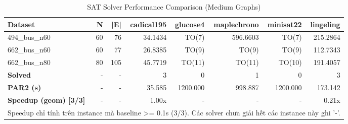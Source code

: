 \begin{table}[htbp]
\centering
\caption{SAT Solver Performance Comparison (Medium Graphs)}
\label{tab:table_solvers_medium}
\begin{tabular}{lrrrrrrr}
\toprule
Dataset & N & |E| & cadical195 & glucose4 & maplechrono & minisat22 & lingeling \\
\midrule
494\_bus\_n60 & 60 & 76 & 34.1434 & TO(7) & 596.6603 & TO(7) & 215.2864 \\
662\_bus\_n60 & 60 & 77 & 26.8385 & TO(9) & TO(9) & TO(9) & 112.7343 \\
662\_bus\_n80 & 80 & 105 & 45.7719 & TO(11) & TO(11) & TO(10) & 191.4057 \\
\midrule
\textbf{Solved} & - & - & 3 & 0 & 1 & 0 & 3 \\
\textbf{PAR2 (s)} & - & - & 35.585 & 1200.000 & 998.887 & 1200.000 & 173.142 \\
\textbf{Speedup (geom) [3/3]} & - & - & 1.00x & - & - & - & 0.21x \\
\bottomrule
\multicolumn{8}{l}{\footnotesize Speedup chỉ tính trên instance mà baseline >= 0.1s (3/3). Các solver chưa giải hết các instance này ghi '-'.} \\
\end{tabular}
\end{table}
